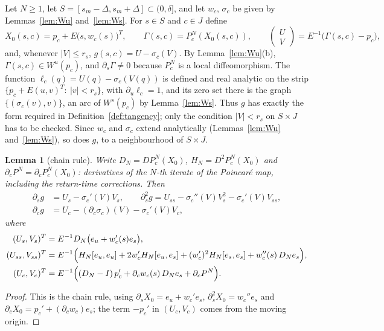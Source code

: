 \documentclass[11pt]{amsart}
\newtheorem{lemma}[thm]{Lemma}
\theoremstyle{definition}
\theoremstyle{remark}
\newcommand{\eu}{e_u}
\newcommand{\es}{e_s}
\newcommand{\Wu}{W^u}
\newcommand{\Ws}{W^s}
\begin{document}
Let $N\ge1$, let $S=[s_m-\Delta,s_m+\Delta]\subset(0,\delta]$, and let $w_c$, $\sigma_c$ be given by
Lemmas~\ref{lem:Wu} and~\ref{lem:Ws}. For $s\in S$ and $c\in J$ define
\begin{equation}\label{eq:defg}
X_0(s,c)=p_c+E\bigl(s,w_c(s)\bigr)^T,\qquad \Gamma(s,c)=P_c^N(X_0(s,c)),\qquad
\begin{pmatrix}U\\V\end{pmatrix}=E^{-1}\bigl(\Gamma(s,c)-p_c\bigr),
\end{equation}
and, whenever $|V|\le r_s$, $g(s,c)=U-\sigma_c(V)$. By Lemma~\ref{lem:Wu}(b), $\Gamma(s,c)\in\Wu(p_c)$, and
$\partial_s\Gamma\neq0$ because $P_c^N$ is a local diffeomorphism. The function
$\ell_c(q)=U(q)-\sigma_c(V(q))$ is defined and real analytic on the strip
$\{p_c+E(u,v)^T:\ |v|<r_s\}$, with $\partial_u\ell_c=1$, and its zero set there is the graph
$\{(\sigma_c(v),v)\}$, an arc of $\Ws(p_c)$ by Lemma~\ref{lem:Ws}. Thus $g$ has exactly the form required in
Definition~\ref{def:tangency}; only the condition $|V|<r_s$ on $S\times J$ has to be checked. Since $w_c$ and
$\sigma_c$ extend analytically (Lemmas~\ref{lem:Wu} and~\ref{lem:Ws}), so does $g$, to a neighbourhood of
$S\times J$.

\begin{lemma}[chain rule]\label{lem:chain}
Write $D_N=DP_c^N(X_0)$, $H_N=D^2P_c^N(X_0)$ and $\partial_cP^N=\partial_cP_c^N(X_0)$: derivatives of the
$N$-th iterate of the Poincar\'e map, including the return-time corrections. Then
\begin{align*}
\partial_s g&=U_s-\sigma_c'(V)V_s,\qquad
\partial^2_sg=U_{ss}-\sigma_c''(V)V_s^2-\sigma_c'(V)V_{ss},\\
\partial_cg&=U_c-(\partial_c\sigma_c)(V)-\sigma_c'(V)V_c,
\end{align*}
where
\begin{align*}
(U_s,V_s)^T&=E^{-1}D_N\bigl(\eu+w_c'(s)\es\bigr),\\
(U_{ss},V_{ss})^T&=E^{-1}\Bigl(H_N[\eu,\eu]+2w_c'H_N[\eu,\es]+(w_c')^2H_N[\es,\es]+w_c''(s)\,D_N\es\Bigr),\\
(U_c,V_c)^T&=E^{-1}\Bigl((D_N-I)\,p_c'+\partial_cw_c(s)\,D_N\es+\partial_cP^N\Bigr).
\end{align*}
\end{lemma}

\begin{proof}
This is the chain rule, using $\partial_sX_0=\eu+w_c'\es$, $\partial_s^2X_0=w_c''\es$ and
$\partial_cX_0=p_c'+(\partial_cw_c)\es$; the term $-p_c'$ in $(U_c,V_c)$ comes from the moving origin.
\end{proof}
\end{document}

